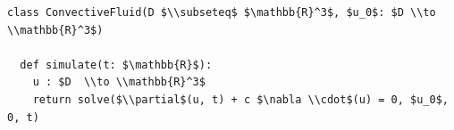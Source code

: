 \documentclass[border=10pt]{standalone}
\begin{document}
\begin{lstlisting}
class ConvectiveFluid(D $\\subseteq$ $\mathbb{R}^3$, $u_0$: $D \\to \\mathbb{R}^3$)

  def simulate(t: $\mathbb{R}$):
    u : $D  \\to \\mathbb{R}^3$
    return solve($\\partial$(u, t) + c $\nabla \\cdot$(u) = 0, $u_0$, 0, t)
\end{lstlisting}
\end{document}
